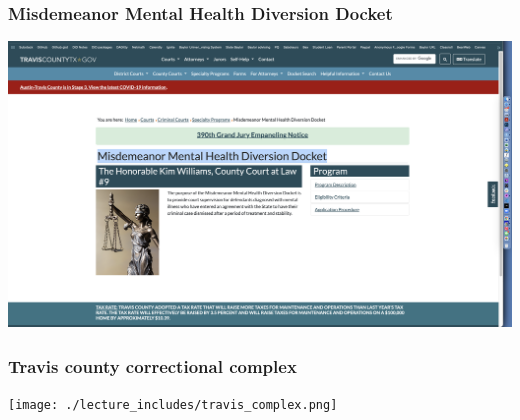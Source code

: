 \documentclass{beamer}
\begin{document}
\begin{frame}
  \frametitle{Misdemeanor Mental Health Diversion Docket }

  \includegraphics[scale=0.16]{./lecture_includes/mhc.png}

\end{frame}

\begin{frame}
  \frametitle{Travis county correctional complex}

  \texttt{[image: ./lecture\_includes/travis\_complex.png]}

\end{frame}
\end{document}
